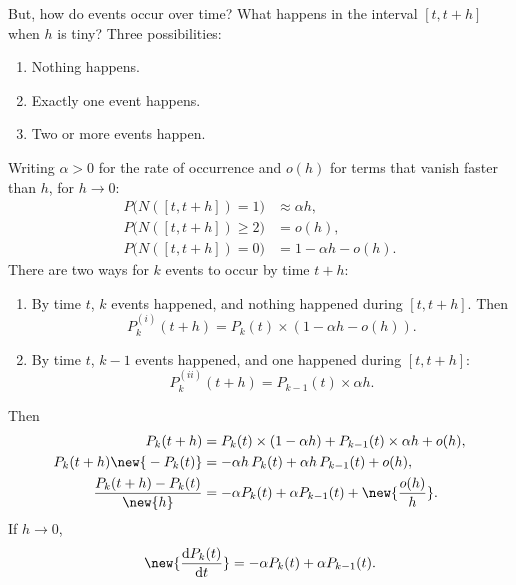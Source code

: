 But, how do events occur over time? What happens in the interval $[t, t+h]$ when $h$ is tiny? Three possibilities:
\begin{enumerate}[label=\roman*.]
\item Nothing happens.
\item Exactly one event happens.
\item Two or more events happen.
\end{enumerate}
Writing $\alpha > 0$ for the rate of occurrence and $o(h)$ for terms that vanish faster than $h$, for $h \to 0$:
\begin{align*}
P\big(N([t,t+h]) = 1\big) &\approx \alpha h,\\
P\big(N([t,t+h]) \ge 2\big) &= o(h),\\
P\big(N([t,t+h]) = 0\big) &= 1 - \alpha h - o(h).
\end{align*}
There are two ways for $k$ events to occur by time $t+h$:
\begin{enumerate}[label=(\roman*)]
\item By time $t$, $k$ events happened, and nothing happened during $[t, t+h]$. Then
\[
P_k^{(i)}(t+h) = P_k(t)\times(1 - \alpha h - o(h)).
\]
\item By time $t$, $k-1$ events happened, and one happened during $[t,t+h]$:
\[
P_k^{(ii)}(t+h) = P_{k-1}(t)\times \alpha h.
\]
\end{enumerate}
Then
\begin{align*}
P_k(t+h) &= P_k(t)\times(1 - \alpha h) + P_{k-1}(t)\times \alpha h + o(h),\\
P_k(t+h) \new{{}- P_k(t)} &= -\alpha h\,P_k(t) + \alpha h\,P_{k-1}(t) + o(h),\\
\frac{P_k(t+h) - P_k(t)}{\new{h}} &= -\alpha P_k(t) + \alpha P_{k-1}(t) + \new{\frac{o(h)}{h}}.
\end{align*}
If $h \to 0$,
\[
\new{\frac{\mathrm{d}P_k(t)}{\mathrm{d}t}} = -\alpha P_k(t) + \alpha P_{k-1}(t).
\]

